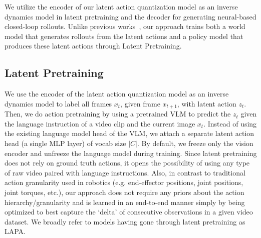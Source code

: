 \documentclass{article} %
\begin{document}
We utilize the encoder of our latent action quantization model as an inverse dynamics model in latent pretraining and the decoder for generating neural-based closed-loop rollouts. Unlike previous works~\citep{bruce2024genie, valevski2024diffusion}, our approach trains both a world model that generates rollouts from the latent actions and a policy model that produces these latent actions through Latent Pretraining.

\subsection{Latent Pretraining}
We use the encoder of the latent action quantization model as an inverse dynamics model to label all {frames} $x_t$, given {frame} $x_{t+1}$, with {latent action} $z_t$. Then, {we do action pretraining by using a pretrained VLM} to predict the $z_t$ given the language instruction of a video clip and the current image $x_t$. Instead of using the existing language model head of the VLM, we attach a separate latent action head {(a single MLP layer)} of vocab size $|C|$. By default, we freeze only the vision encoder and unfreeze the language model during training. Since latent pretraining does not rely on ground truth actions, it opens the possibility of using any type of raw video paired with language instructions. Also, in contrast to traditional action granularity used in robotics (e.g. end-effector positions, joint positions, joint torques, etc.), our approach does not require any priors about the action hierarchy/granularity and is learned in an end-to-end manner simply by being optimized to best capture the `delta' of consecutive observations in a given video dataset. We broadly refer to models having gone through latent pretraining as LAPA.
\end{document}
